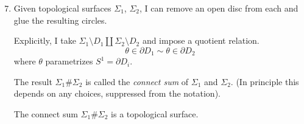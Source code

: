 \begin{enumerate}
    \setcounter{enumi}{6}
    \item Given topological surfaces \(\Sigma_1\), \(\Sigma_2\), I can remove an open disc from each and glue the resulting circles.

    Explicitly, I take \(\Sigma_{1}\setminus D_1\coprod \Sigma_2 \setminus D_2\) and impose a quotient relation. 
    \[
        \theta \in \partial D_1 \sim \theta \in \partial D_2
    \]
    where \(\theta\) parametrizes \(S^1 = \partial D_i\).

    The result \(\Sigma_1 \# \Sigma_2\) is called the \textit{connect sum} of \(\Sigma_1\) and \(\Sigma_2\). (In principle this depends on any choices, suppressed from the notation).

    The connect sum \(\Sigma_1\#\Sigma_2\) is a topological surface.
\end{enumerate}